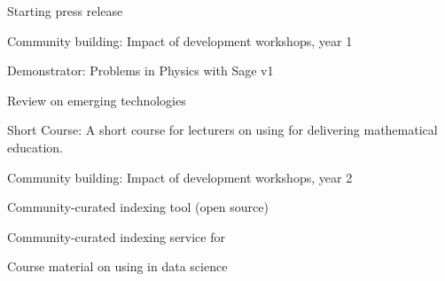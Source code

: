 \begin{workpackage}

\begin{wpdelivs}
\begin{wpdeliv}[due=6,id=press-release-1,dissem=PU,nature=DEC,lead=PS]{Starting press release}\end{wpdeliv}
 \begin{wpdeliv}[due=12,id=workshops-1,dissem=PU,nature=R,lead=PS]{Community building: Impact of development workshops, year 1}\end{wpdeliv}
  \begin{wpdeliv}[due=12,id=ibook3a,dissem=PU,nature=DEM,lead=US]{Demonstrator: Problems in Physics with Sage v1} \end{wpdeliv}
  \begin{wpdeliv}[due=12,id=techno,dissem=PU,nature=R,lead=PS]{Review on emerging technologies} \end{wpdeliv}
   \begin{wpdeliv}[due=18,id=short-course,dissem=PU,nature=DEC,lead=USH]{Short Course: A short course for lecturers on using \TheProject for delivering mathematical education.}\end{wpdeliv}
\begin{wpdeliv}[due=24,id=workshops-2,dissem=PU,nature=R,lead=PS]{Community building: Impact of development workshops, year 2}\end{wpdeliv}
\begin{wpdeliv}[due=24,id=ils-tool,dissem=PU,nature=P,lead=UV]{Community-curated
     indexing tool (open source)} \end{wpdeliv}
      \begin{wpdeliv}[due=24,id=ils-service,dissem=PU,nature=DEM,lead=UV]{Community-curated
     indexing service for \TheProject} \end{wpdeliv}
      \begin{wpdeliv}[due=24,id=datascience-course,dissem=PU,nature=DEC,lead=USH]{Course material on using \TheProject in data science} \end{wpdeliv}

\end{wpdelivs}
\end{workpackage}
